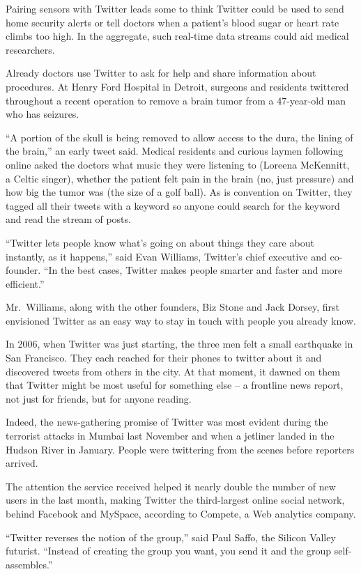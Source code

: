 \documentclass[12pt,a4paper,onecolumn]{article}
\begin{document}
Pairing sensors with Twitter leads some to think Twitter could be used to send home security alerts
or tell doctors when a patient's blood sugar or heart rate climbs too high. In the aggregate, such
real-time data streams could aid medical researchers.

Already doctors use Twitter to ask for help and share information about procedures. At Henry Ford
Hospital in Detroit, surgeons and residents twittered throughout a recent operation to remove a
brain tumor from a 47-year-old man who has seizures.

``A portion of the skull is being removed to allow access to the dura, the lining of the brain,'' an
early tweet said. Medical residents and curious laymen following online asked the doctors what music
they were listening to (Loreena McKennitt, a Celtic singer), whether the patient felt pain in the
brain (no, just pressure) and how big the tumor was (the size of a golf ball). As is convention on
Twitter, they tagged all their tweets with a keyword so anyone could search for the keyword and read
the stream of posts.

``Twitter lets people know what's going on about things they care about instantly, as it happens,''
said Evan Williams, Twitter's chief executive and co-founder. ``In the best cases, Twitter makes
people smarter and faster and more efficient.''

Mr.~Williams, along with the other founders, Biz Stone and Jack Dorsey, first envisioned Twitter as
an easy way to stay in touch with people you already know.

In 2006, when Twitter was just starting, the three men felt a small earthquake in San Francisco.
They each reached for their phones to twitter about it and discovered tweets from others in the
city. At that moment, it dawned on them that Twitter might be most useful for something else -- a
frontline news report, not just for friends, but for anyone reading.

Indeed, the news-gathering promise of Twitter was most evident during the terrorist attacks in
Mumbai last November and when a jetliner landed in the Hudson River in January. People were
twittering from the scenes before reporters arrived.

The attention the service received helped it nearly double the number of new users in the last
month, making Twitter the third-largest online social network, behind Facebook and MySpace,
according to Compete, a Web analytics company.

``Twitter reverses the notion of the group,'' said Paul Saffo, the Silicon Valley futurist.
``Instead of creating the group you want, you send it and the group self-assembles.''
\end{document}
